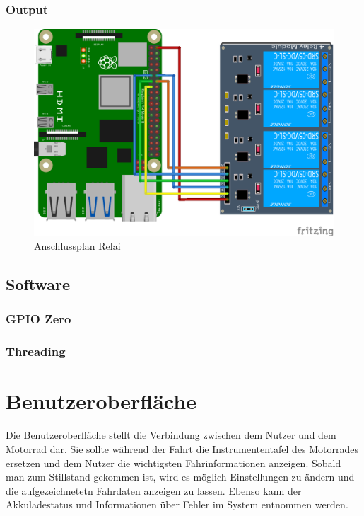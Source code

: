 \subsubsection{Output}

\begin{figure}[H]
	\begin{center}
		\includegraphics[scale=0.8]{figures/hcis/4ch_relai.png}
			\caption{Anschlussplan Relai}
			\label{fig:output}
	\end{center}
\end{figure}

\subsection{Software}

\subsubsection{GPIO Zero}

\subsubsection{Threading}

\newpage


\section{Benutzeroberfläche}
Die Benutzeroberfläche stellt die Verbindung zwischen dem Nutzer und dem Motorrad dar. Sie sollte während der Fahrt die Instrumententafel des Motorrades ersetzen und dem Nutzer die wichtigsten Fahrinformationen anzeigen. Sobald man zum Stillstand gekommen ist, wird es möglich Einstellungen zu ändern und die aufgezeichnetetn Fahrdaten anzeigen zu lassen. Ebenso kann der Akkuladestatus und Informationen über Fehler im System entnommen werden.

